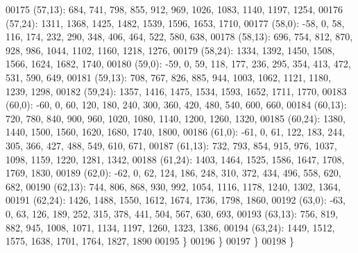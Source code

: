 \begin{DoxyCode}
00175       (57,13): 684, 741, 798, 855, 912, 969, 1026, 1083, 1140, 1197, 1254,
00176       (57,24): 1311, 1368, 1425, 1482, 1539, 1596, 1653, 1710,
00177       (58,0): -58, 0, 58, 116, 174, 232, 290, 348, 406, 464, 522, 580, 638,
00178       (58,13): 696, 754, 812, 870, 928, 986, 1044, 1102, 1160, 1218, 1276,
00179       (58,24): 1334, 1392, 1450, 1508, 1566, 1624, 1682, 1740,
00180       (59,0): -59, 0, 59, 118, 177, 236, 295, 354, 413, 472, 531, 590, 649,
00181       (59,13): 708, 767, 826, 885, 944, 1003, 1062, 1121, 1180, 1239, 1298,
00182       (59,24): 1357, 1416, 1475, 1534, 1593, 1652, 1711, 1770,
00183       (60,0): -60, 0, 60, 120, 180, 240, 300, 360, 420, 480, 540, 600, 660,
00184       (60,13): 720, 780, 840, 900, 960, 1020, 1080, 1140, 1200, 1260, 1320,
00185       (60,24): 1380, 1440, 1500, 1560, 1620, 1680, 1740, 1800,
00186       (61,0): -61, 0, 61, 122, 183, 244, 305, 366, 427, 488, 549, 610, 671,
00187       (61,13): 732, 793, 854, 915, 976, 1037, 1098, 1159, 1220, 1281, 1342,
00188       (61,24): 1403, 1464, 1525, 1586, 1647, 1708, 1769, 1830,
00189       (62,0): -62, 0, 62, 124, 186, 248, 310, 372, 434, 496, 558, 620, 682,
00190       (62,13): 744, 806, 868, 930, 992, 1054, 1116, 1178, 1240, 1302, 1364,
00191       (62,24): 1426, 1488, 1550, 1612, 1674, 1736, 1798, 1860,
00192       (63,0): -63, 0, 63, 126, 189, 252, 315, 378, 441, 504, 567, 630, 693,
00193       (63,13): 756, 819, 882, 945, 1008, 1071, 1134, 1197, 1260, 1323, 1386,
00194       (63,24): 1449, 1512, 1575, 1638, 1701, 1764, 1827, 1890
00195       \}
00196    \}
00197 \}
00198 \}
\end{DoxyCode}
